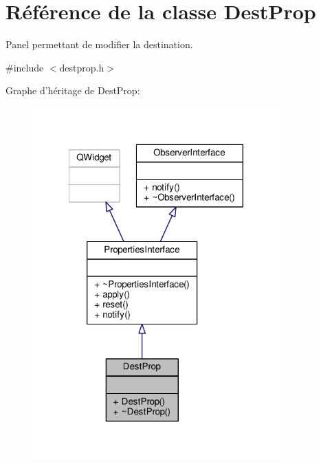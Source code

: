 \hypertarget{classDestProp}{\section{Référence de la classe Dest\+Prop}
\label{classDestProp}
}


Panel permettant de modifier la destination.  




{\ttfamily \#include $<$destprop.\+h$>$}



Graphe d'héritage de Dest\+Prop\+:\nopagebreak
\begin{figure}[H]
\begin{center}
\leavevmode
\includegraphics[width=269pt]{d4/d2d/classDestProp__inherit__graph}
\end{center}
\end{figure}


